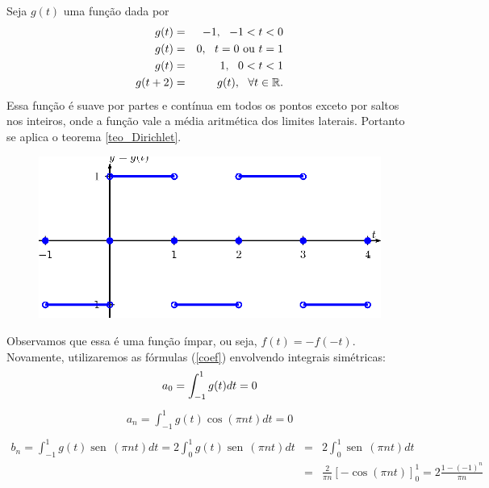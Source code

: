 \documentclass[a4paper,10pt]{book}
\newcommand{\sen}{\operatorname{sen}\,}
\begin{document}
 Seja $g(t)$ uma função dada por
 \begin{eqnarray*}
 g(t)&=&-1, \ \ -1< t<0\\
 g(t)&=&0, \ \ t=0\ \hbox{ou}\ t=1\\
 g(t)&=&1, \ \ 0< t<1\\
 g(t+2)&=&g(t),\ \ \forall t\in\mathbb{R}.
 \end{eqnarray*}
 Essa função é suave por partes e contínua em todos os pontos exceto por saltos nos inteiros, onde a função vale a média aritmética dos limites laterais. Portanto se aplica o teorema \ref{teo_Dirichlet}.
 \begin{figure}[!ht]
 \begin{center}
 \includegraphics{figs/cap_series_figura_3}\end{center}
 \end{figure}
 Observamos que essa é uma função ímpar, ou seja, $f(t)=-f(-t)$. Novamente, utilizaremos as fórmulas (\ref{coef}) envolvendo integrais simétricas:
   \begin{equation*}
    a_0= \int_{-1}^{1} g(t) dt=0\\
 	\end{equation*}
 	\begin{eqnarray*}
    a_n=  \int_{-1}^{1} g(t)\cos(\pi n t)dt=0\\
 	 \end{eqnarray*}
 	\begin{eqnarray*}
    b_n=\int_{-1}^{1} g(t)\sen(\pi n t)dt=2\int_{0}^{1} g(t)\sen(\pi n t)dt&=&2\int_{0}^{1} \sen(\pi n t)dt\\
 	&=&\frac{2}{\pi n}\left[-\cos(\pi n t)\right]_0^1=2\frac{1-(-1)^n}{\pi n}
   \end{eqnarray*}
\end{document}
